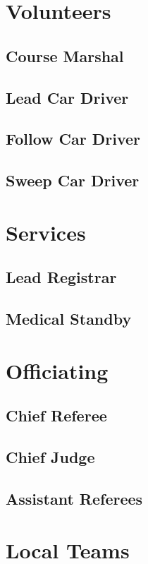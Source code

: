 \section{Volunteers}

\subsection{Course Marshal}
\label{role:course_marshal}

\subsection{Lead Car Driver}
\label{role:lead_driver}

\subsection{Follow Car Driver}
\label{role:follow_driver}

\subsection{Sweep Car Driver}
\label{role:sweep_driver}

\section{Services}

\subsection{Lead Registrar}
\label{role:registrar}

\subsection{Medical Standby}
\label{role:medical}

\section{Officiating}

\subsection{Chief Referee}
\label{role:chief_ref}

\subsection{Chief Judge}
\label{role:chief_judge}

\subsection{Assistant Referees}
\label{role:assistant_refs}

\section{Local Teams}
\label{role:local_teams}
